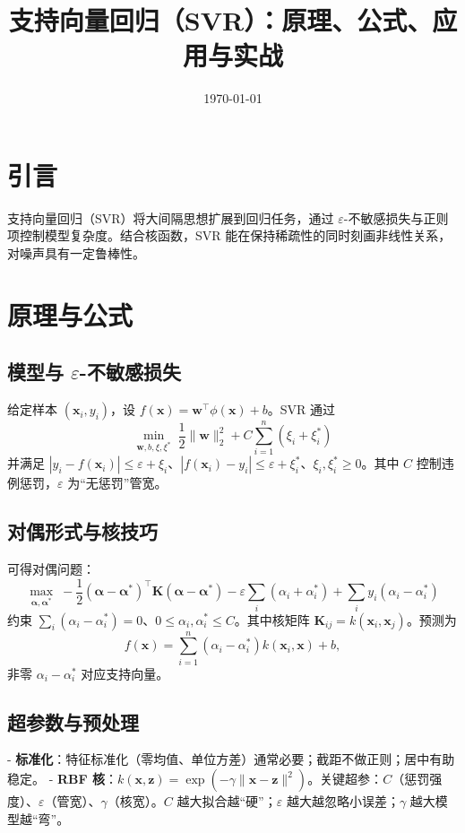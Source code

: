\documentclass[UTF8,zihao=-4]{ctexart}
\title{支持向量回归（SVR）：原理、公式、应用与实战}
\author{}
\date{\today}
\begin{document}
\maketitle
\tableofcontents

\section{引言}
支持向量回归（SVR）将大间隔思想扩展到回归任务，通过 \(\varepsilon\)-不敏感损失与正则项控制模型复杂度。结合核函数，SVR 能在保持稀疏性的同时刻画非线性关系，对噪声具有一定鲁棒性。

\section{原理与公式}
\subsection{模型与 \(\varepsilon\)-不敏感损失}
给定样本 \((\mathbf{x}_i,y_i)\)，设 \(f(\mathbf{x})=\mathbf{w}^\top\phi(\mathbf{x})+b\)。SVR 通过
\begin{equation}
\min_{\mathbf{w},b,\xi,\xi^*} \; \frac{1}{2}\lVert\mathbf{w}\rVert_2^2 + C\sum_{i=1}^n (\xi_i+\xi^*_i)
\end{equation}
并满足 \(|y_i - f(\mathbf{x}_i)| \le \varepsilon + \xi_i\)、\(|f(\mathbf{x}_i)-y_i| \le \varepsilon + \xi_i^*\)、\(\xi_i,\xi_i^*\ge 0\)。其中 \(C\) 控制违例惩罚，\(\varepsilon\) 为“无惩罚”管宽。

\subsection{对偶形式与核技巧}
可得对偶问题：
\begin{equation}
\max_{\bm{\alpha},\bm{\alpha}^*} \; -\frac{1}{2}(\bm{\alpha}-\bm{\alpha}^*)^\top \mathbf{K}(\bm{\alpha}-\bm{\alpha}^*) - \varepsilon \sum_i (\alpha_i+\alpha_i^*) + \sum_i y_i(\alpha_i-\alpha_i^*)
\end{equation}
约束 \(\sum_i (\alpha_i-\alpha_i^*)=0\)、\(0\le \alpha_i,\alpha_i^*\le C\)。其中核矩阵 \(\mathbf{K}_{ij}=k(\mathbf{x}_i,\mathbf{x}_j)\)。预测为
\begin{equation}
f(\mathbf{x}) = \sum_{i=1}^n (\alpha_i-\alpha_i^*) k(\mathbf{x}_i,\mathbf{x}) + b,
\end{equation}
非零 \(\alpha_i-\alpha_i^*\) 对应支持向量。

\subsection{超参数与预处理}
- \textbf{标准化}：特征标准化（零均值、单位方差）通常必要；截距不做正则；居中有助稳定。
- \textbf{RBF 核}：\(k(\mathbf{x},\mathbf{z})=\exp(-\gamma\lVert\mathbf{x}-\mathbf{z}\rVert^2)\)。关键超参：\(C\)（惩罚强度）、\(\varepsilon\)（管宽）、\(\gamma\)（核宽）。\(C\) 越大拟合越“硬”；\(\varepsilon\) 越大越忽略小误差；\(\gamma\) 越大模型越“弯”。
\end{document}
